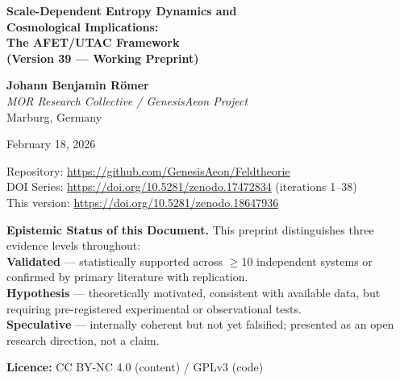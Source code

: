 \documentclass[12pt,a4paper]{article}
\theoremstyle{definition}
\begin{document}

\begin{titlepage}
  \centering
  \vspace*{1.5cm}
  {\LARGE\bfseries\color{solidblue}
    Scale-Dependent Entropy Dynamics and\\[6pt]
    Cosmological Implications:\\[8pt]
    The AFET/UTAC Framework\\[4pt]
    (Version 39 --- Working Preprint)
  \par}

  \vspace{1.2cm}
  {\large
    \textbf{Johann Benjamin Römer}\\[4pt]
    \textit{MOR Research Collective / GenesisAeon Project}\\[4pt]
    Marburg, Germany
  \par}

  \vspace{0.8cm}
  {\normalsize February 18, 2026\par}

  \vspace{0.6cm}
  {\small
    Repository: \url{https://github.com/GenesisAeon/Feldtheorie}\\
    DOI Series: \url{https://doi.org/10.5281/zenodo.17472834}
    (iterations 1--38)\\
    This version: \url{https://doi.org/10.5281/zenodo.18647936}
  \par}

  \vspace{1.2cm}
  \begin{tcolorbox}[colback=solidblue!6, colframe=solidblue!40,
                    width=0.92\textwidth]
    \small\textbf{Epistemic Status of this Document.}
    This preprint distinguishes three evidence levels throughout:\\[3pt]
    \textcolor{confirmgreen}{\textbf{Validated}} --- statistically supported across $\geq$10 independent
    systems or confirmed by primary literature with replication.\\[3pt]
    \textcolor{hypothesisgray}{\textbf{Hypothesis}} --- theoretically motivated, consistent with available
    data, but requiring pre-registered experimental or observational tests.\\[3pt]
    \textcolor{warningorange}{\textbf{Speculative}} --- internally coherent but not yet falsified;
    presented as an open research direction, not a claim.
  \end{tcolorbox}

  \vspace{1cm}
  \textbf{Licence:} CC BY-NC 4.0 (content) / GPLv3 (code)
\end{titlepage}
\end{document}
